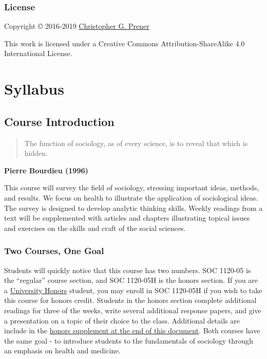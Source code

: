 \documentclass[]{book}
\begin{document}
\hypertarget{license}{%
\section*{License}\label{license}}

Copyright © 2016-2019 \href{https://chris-prener.github.io}{Christopher G. Prener}

This work is licensed under a Creative Commons Attribution-ShareAlike 4.0 International License.

\hypertarget{part-syllabus}{%
\part{Syllabus}\label{part-syllabus}}

\hypertarget{course-introduction}{%
\chapter{Course Introduction}\label{course-introduction}}

\begin{quote}
The function of sociology, as of every science, is to reveal that which is hidden.
\end{quote}

\textbf{Pierre Bourdieu (1996)}

This course will survey the field of sociology, stressing important ideas, methods, and results. We focus on health to illustrate the application of sociological ideas. The survey is designed to develop analytic thinking skills. Weekly readings from a text will be supplemented with articles and chapters illustrating topical issues and exercises on the skills and craft of the social sciences.

\hypertarget{two-courses-one-goal}{%
\section{Two Courses, One Goal}\label{two-courses-one-goal}}

Students will quickly notice that this course has two numbers. SOC 1120-05 is the ``regular'' course section, and SOC 1120-05H is the honors section. If you are a \href{https://www.slu.edu/honors/index.php}{University Honors} student, you may enroll in SOC 1120-05H if you wish to take this course for honors credit. Students in the honors section complete additional readings for three of the weeks, write several additional response papers, and give a presentation on a topic of their choice to the class. Additional details are include in the \href{/syllabus/honors-overview.html}{honors supplement at the end of this document}. Both courses have the same goal - to introduce students to the fundamentals of sociology through an emphasis on health and medicine.
\end{document}
